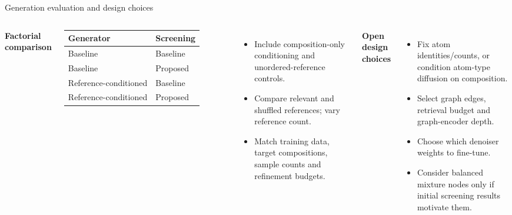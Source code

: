 \documentclass[10pt,aspectratio=169]{beamer}
\begin{document}
\begin{frame}{Generation evaluation and design choices}
\begin{columns}[T]
\textbf{Factorial comparison}\par\vspace{2mm}
\small\begin{tabular}{ll}\toprule
Generator & Screening \\\midrule
Baseline & Baseline \\
Baseline & Proposed \\
Reference-conditioned & Baseline \\
Reference-conditioned & Proposed \\\bottomrule
\end{tabular}
\vspace{3mm}
\begin{itemize}
\item Include composition-only conditioning and unordered-reference controls.
\item Compare relevant and shuffled references; vary reference count.
\item Match training data, target compositions, sample counts and refinement budgets.
\end{itemize}
\textbf{Open design choices}
\begin{itemize}\setlength\itemsep{3mm}
\item Fix atom identities/counts, or condition atom-type diffusion on composition.
\item Select graph edges, retrieval budget and graph-encoder depth.
\item Choose which denoiser weights to fine-tune.
\item Consider balanced mixture nodes only if initial screening results motivate them.
\end{itemize}
\end{columns}
\end{frame}
\end{document}
